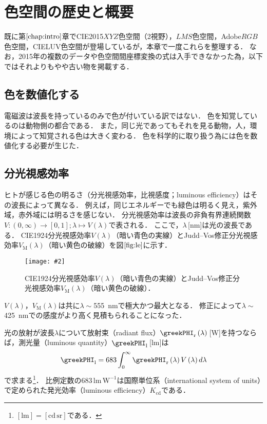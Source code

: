 \documentclass[uplatex,paper=a4,fontsize=4.0truemm,jafontsize=4.0truemm,head_space=30.0truemm,foot_space=30.0truemm,baselineskip=8.0truemm,line_length=40zw,gutter=25.0truemm,oneside,openany,fleqn,hanging_panctuation,open_bracket_pos=nibu_tentsuki,dvipdfmx,jis2004,book,titlepage]{jlreq}
\theoremstyle{mystyle}
\newcommand{\captiondot}[1]{\caption{#1．}}
\newcommand{\figureinput}[4]{\begin{figure}[tbp]\centering\texttt{[image: \#2]}\captiondot{#3}\label{fig:#4}\end{figure}}
\newcommand{\mathdisplaystyle}[1]{\(\displaystyle{#1}\)}
\newcommand{\Reference}[1]{\mathdisplaystyle{\ref{#1}}}
\newcommand{\negativevalue}[1]{{-#1}}
\newcommand{\parentheses}[1]{\left(#1\right)}
\newcommand{\squarebrackets}[1]{\left[#1\right]}
\begin{document}
	\chapter{色空間の歴史と概要}
		既に第\Reference{chap:intro}章でCIE2015\mathdisplaystyle{XYZ}色空間（2\textdegree 視野），\mathdisplaystyle{LMS}色空間，Adobe\mathdisplaystyle{RGB}色空間，CIELUV色空間が登場しているが，本章で一度これらを整理する．
		なお，2015年の複数のデータや色空間間座標変換の式は入手できなかった為，以下ではそれよりもやや古い物を掲載する．
		\section{色を数値化する}
			電磁波は波長を持っているのみで色が付いている訳ではない．
			色を知覚しているのは動物側の都合である．
			また，同じ光であってもそれを見る動物，人，環境によって知覚される色は大きく変わる．
			色を科学的に取り扱う為には色を数値化する必要が生じた．
		\section{分光視感効率}
			ヒトが感じる色の明るさ（分光視感効率，比視感度；luminous efficiency）はその波長によって異なる．
			例えば，同じエネルギーでも緑色は明るく見え，紫外域，赤外域には明るさを感じない．
			分光視感効率は波長の非負有界連続関数\mathdisplaystyle{V\colon\parentheses{0,\infty}\to\squarebrackets{0,1};\lambda\mapsto V\parentheses{\lambda}}で表される．
			ここで，\mathdisplaystyle{\lambda}\,[nm]は光の波長である．
			CIE1924分光視感効率\mathdisplaystyle{V\parentheses{\lambda}}（暗い青色の実線）とJudd--Vos修正分光視感効率\mathdisplaystyle{V_\textrm{M}\parentheses{\lambda}}\cite{Vos1978}（暗い黄色の破線）を図\Reference{fig:le}に示す．
			\figureinput{width=\linewidth}{D:/a/figs/le.png}{CIE1924分光視感効率\mathdisplaystyle{V\parentheses{\lambda}}（暗い青色の実線）とJudd--Vos修正分光視感効率\mathdisplaystyle{V_\textrm{M}\parentheses{\lambda}}（暗い黄色の破線）}{le}
			\mathdisplaystyle{V\parentheses{\lambda}}，\mathdisplaystyle{V_\textrm{M}\parentheses{\lambda}}は共に\mathdisplaystyle{\lambda\sim{}}\SI{555}{nm}で極大かつ最大となる．
			修正によって\mathdisplaystyle{\lambda\sim{}}\SI{425}{nm}での感度がより高く見積もられることになった．

			光の放射が波長\mathdisplaystyle{\lambda}について放射束（radiant flux）\mathdisplaystyle{\greekPHI_\textrm{r}\parentheses{\lambda}}\,[W]を持つならば，測光量（luminous quantity）\mathdisplaystyle{\greekPHI_\textrm{l}}\,[lm]は
			\begin{equation*}
				\greekPHI_\textrm{l}=683\int_0^\infty{\greekPHI_\textrm{r}\parentheses{\lambda}V\parentheses{\lambda}}\,d\lambda
			\end{equation*}
			で求まる\footnote{\mathdisplaystyle{[\textrm{lm}]=[\textrm{cd}\,\textrm{sr}]}である．}．
			比例定数の683\,lm\,\mathdisplaystyle{\textrm{W}^{\negativevalue{1}}}は国際単位系（international system of units）で定められた発光効率（luminous efficiency）\mathdisplaystyle{K_\textrm{cd}}である．
\end{document}
